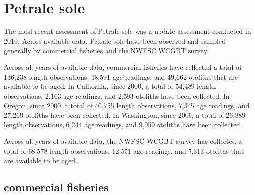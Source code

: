\documentclass[11pt,
  english,
  letterpaper,
]{article}
\begin{document}

\hypertarget{petrale-sole}{%
\section{Petrale sole}\label{petrale-sole}}

\leavevmode\tagmcend\tagstructend


The most recent assessment of Petrale sole was a update assessment conducted in 2019. Across available data, Petrale sole have been observed and sampled generally by commercial fisheries and the NWFSC WCGBT survey.

\leavevmode\tagmcend\tagstructend\par


Across all years of available data, commercial fisheries have collected a total of 136,238 length observations, 18,591 age readings, and 49,662 otoliths that are available to be aged. In California, since 2000, a total of 54,489 length observations, 2,163 age readings, and 2,593 otoliths have been collected. In Oregon, since 2000, a total of 40,755 length observations, 7,345 age readings, and 27,269 otoliths have been collected. In Washington, since 2000, a total of 26,889 length observations, 6,244 age readings, and 9,959 otoliths have been collected.

\leavevmode\tagmcend\tagstructend\par


Across all years of available data, the NWFSC WCGBT survey has collected a total of 68,578 length observations, 12,551 age readings, and 7,313 otoliths that are available to be aged.

\leavevmode\tagmcend\tagstructend\par


\hypertarget{commercial-fisheries-36}{%
\subsection{commercial fisheries}\label{commercial-fisheries-36}}

\leavevmode\tagmcend\tagstructend

\end{document}
